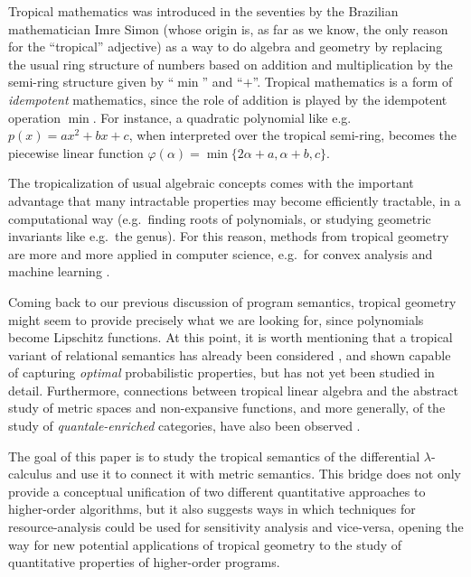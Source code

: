 Tropical mathematics was introduced in the seventies by the Brazilian mathematician Imre Simon (whose origin is, as far as we know, the only reason for the ``tropical'' adjective) as a way to do algebra and geometry by replacing the usual ring structure of numbers based on addition and multiplication by the semi-ring structure given by ``$\min$'' and ``$+$''.
%
%
Tropical mathematics is a form of \emph{idempotent} mathematics, since the role of addition is 
played by the idempotent operation $\min$.
For instance, a quadratic polynomial like e.g.~$p(x)=ax^{2}+bx+c$, when interpreted over the tropical semi-ring, becomes the piecewise linear function
$
\varphi(\alpha)=\min\{2\alpha + a, \alpha+b, c\}
$.

The tropicalization of usual algebraic concepts comes with the important advantage that many intractable properties may become efficiently tractable, in a computational way (e.g.~finding roots of polynomials, or studying geometric invariants like e.g.~the genus). For this reason, methods from tropical geometry are more and more applied in computer science, e.g.~for convex analysis and machine learning \cite{}.

Coming back to our previous discussion of program semantics, tropical geometry might seem to provide precisely what we are looking for, since polynomials become Lipschitz functions.
At this point, it is worth mentioning that a tropical variant of relational semantics has already been considered \cite{}, and shown capable of capturing \emph{optimal} probabilistic properties, but has not yet been studied in detail. Furthermore, connections between tropical linear algebra and the abstract study of metric spaces and non-expansive functions, and more generally, of the study of \emph{quantale-enriched} categories, have also been observed \cite{}.

The goal of this paper is to study the tropical semantics of the differential $\lambda$-calculus and use it to connect it with metric semantics. This bridge does not only provide a conceptual unification of two different quantitative approaches to higher-order algorithms, but it also 
suggests ways in which techniques for resource-analysis could be used for sensitivity analysis and vice-versa, opening the way for new potential applications of tropical geometry to the study of quantitative properties of higher-order programs.


